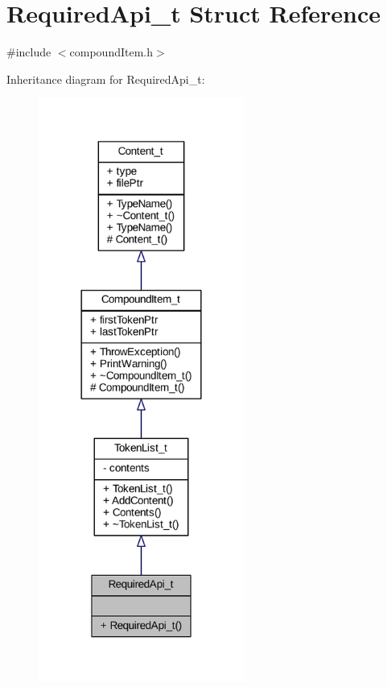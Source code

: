 \hypertarget{struct_required_api__t}{}\section{Required\+Api\+\_\+t Struct Reference}
\label{struct_required_api__t}


{\ttfamily \#include $<$compound\+Item.\+h$>$}



Inheritance diagram for Required\+Api\+\_\+t\+:
\nopagebreak
\begin{figure}[H]
\begin{center}
\leavevmode
\includegraphics[width=191pt]{struct_required_api__t__inherit__graph}
\end{center}
\end{figure}


